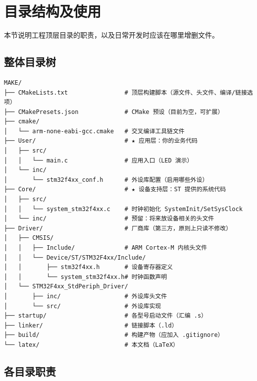 \section{目录结构及使用}

本节说明工程顶层目录的职责，以及日常开发时应该在哪里增删文件。

\subsection{整体目录树}

\begin{lstlisting}[style=generic]
MAKE/
├── CMakeLists.txt                # 顶层构建脚本（源文件、头文件、编译/链接选项）
├── CMakePresets.json             # CMake 预设（目前为空，可扩展）
├── cmake/
│   └── arm-none-eabi-gcc.cmake   # 交叉编译工具链文件
├── User/                         # ★ 应用层：你的业务代码
│   ├── src/
│   │   └── main.c                # 应用入口（LED 演示）
│   └── inc/
│       └── stm32f4xx_conf.h      # 外设库配置（启用哪些外设）
├── Core/                         # ★ 设备支持层：ST 提供的系统代码
│   ├── src/
│   │   └── system_stm32f4xx.c    # 时钟初始化 SystemInit/SetSysClock
│   └── inc/                      # 预留：将来放设备相关的头文件
├── Driver/                       # 厂商库（第三方，原则上只读不修改）
│   ├── CMSIS/
│   │   ├── Include/              # ARM Cortex-M 内核头文件
│   │   └── Device/ST/STM32F4xx/Include/
│   │       ├── stm32f4xx.h       # 设备寄存器定义
│   │       └── system_stm32f4xx.h# 时钟函数声明
│   └── STM32F4xx_StdPeriph_Driver/
│       ├── inc/                  # 外设库头文件
│       └── src/                  # 外设库实现
├── startup/                      # 各型号启动文件（汇编 .s）
├── linker/                       # 链接脚本（.ld）
├── build/                        # 构建产物（应加入 .gitignore）
└── latex/                        # 本文档（LaTeX）
\end{lstlisting}

\subsection{各目录职责}

